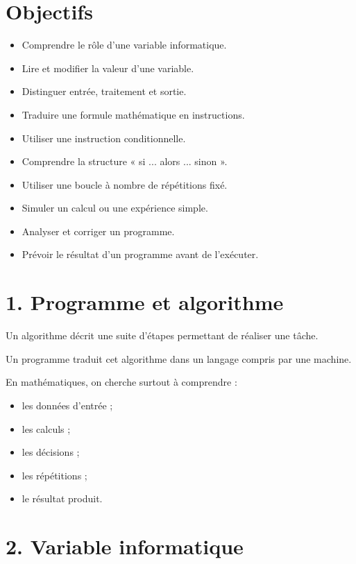 
\section{Objectifs}

\begin{itemize}
\item Comprendre le rôle d'une variable informatique.
\item Lire et modifier la valeur d'une variable.
\item Distinguer entrée, traitement et sortie.
\item Traduire une formule mathématique en instructions.
\item Utiliser une instruction conditionnelle.
\item Comprendre la structure « si ... alors ... sinon ».
\item Utiliser une boucle à nombre de répétitions fixé.
\item Simuler un calcul ou une expérience simple.
\item Analyser et corriger un programme.
\item Prévoir le résultat d'un programme avant de l'exécuter.
\end{itemize}

\section{1. Programme et algorithme}

Un algorithme décrit une suite d'étapes permettant de réaliser une tâche.

Un programme traduit cet algorithme dans un langage compris par une machine.

En mathématiques, on cherche surtout à comprendre :
\begin{itemize}
\item les données d'entrée ;
\item les calculs ;
\item les décisions ;
\item les répétitions ;
\item le résultat produit.
\end{itemize}

\section{2. Variable informatique}

